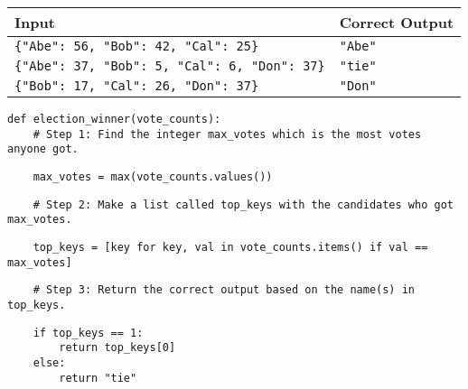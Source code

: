 \documentclass[12pt]{exam}
\begin{document}
\begin{questions}
\begin{tabular}{|l|l|}
\hline
\textbf{Input} & \textbf{Correct Output} \\ \hline
\verb|{"Abe": 56, "Bob": 42, "Cal": 25}| & \verb|"Abe"| \hspace*{1in} \\ \hline
\verb|{"Abe": 37, "Bob": 5, "Cal": 6, "Don": 37}| & \verb|"tie"| \hspace*{1in} \\ \hline
\verb|{"Bob": 17, "Cal": 26, "Don": 37}| & \verb|"Don"| \hspace*{1in} \\ \hline
\end{tabular}

\begin{verbatim}
def election_winner(vote_counts):
    # Step 1: Find the integer max_votes which is the most votes anyone got.
\end{verbatim}
\begin{solution}
\begin{verbatim}
    max_votes = max(vote_counts.values())
\end{verbatim}
\end{solution}
\vfill









\begin{verbatim}
    # Step 2: Make a list called top_keys with the candidates who got max_votes. 
\end{verbatim}
\begin{solution}
\begin{verbatim}
    top_keys = [key for key, val in vote_counts.items() if val == max_votes]
\end{verbatim}
\end{solution}
\vfill








      
\begin{verbatim}
    # Step 3: Return the correct output based on the name(s) in top_keys. 
\end{verbatim}
\begin{solution}
\begin{verbatim}
    if top_keys == 1:
        return top_keys[0]
    else:
        return "tie"
\end{verbatim}
\end{solution}
\vfill






\end{questions}
\end{document}
